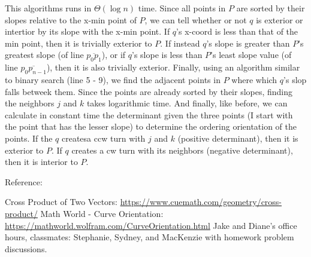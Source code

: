 \documentclass [12pt]{article}
\begin{document}
\begin{enumerate}[label=(\alph*)]
\begin{enumerate}[label=\arabic*.]

            \end{enumerate}
        \cbend

        This algorithms runs in $\Theta(\log n)$ time. Since all points in $P$ are sorted by their slopes relative to the x-min point of $P$, we can tell whether or not $q$ is exterior or intertior by its slope with the x-min point. If $q$'s x-coord is less than that of the min point, then it is trivially exterior to $P$. If instead $q$'s slope is greater than $P$'s greatest slope (of line $\overline{p_0 p_1}$), or if $q$'s slope is less than $P$'s least slope value (of line $\overline{p_0 p_{n-1}}$), then it is also trivially exterior. Finally, using an algorithm similar to binary search (line 5 - 9), we find the adjacent points in $P$ where which $q$'s slop falls betweek them. Since the points are already sorted by their slopes, finding the neighbors $j$ and $k$ takes logarithmic time. And finally, like before, we can calculate in constant time the determinant given the three points (I start with the point that has the lesser slope) to determine the ordering orientation of the points. If the $q$ createsa ccw turn with $j$ and $k$ (positive determinant), then it is exterior to $P$. If $q$ creates a cw turn with its neighbors (negative determinant), then it is interior to $P$. 



        Reference: \cite{officehours}

    \end{enumerate}


    \pagebreak



\begin{thebibliography}{1}
Cross Product of Two Vectors: \url{https://www.cuemath.com/geometry/cross-product/}
Math World - Curve Orientation: \url{https://mathworld.wolfram.com/CurveOrientation.html}
Jake and Diane's office hours, classmates: Stephanie, Sydney, and MacKenzie with homework problem discussions.
\end{thebibliography}
\end{document}

